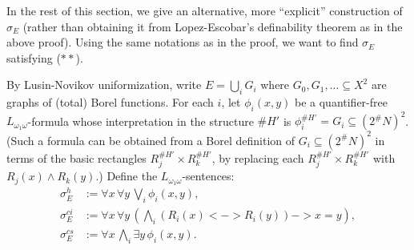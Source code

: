 \documentclass[11pt]{article}
\begin{document}
In the rest of this section, we give an alternative, more ``explicit'' construction of $\sigma_E$ (rather than obtaining it from Lopez-Escobar's definability theorem as in the above proof).  Using the same notations as in the proof, we want to find $\sigma_E$ satisfying ($**$).

By Lusin-Novikov uniformization, write $E = \bigcup_i G_i$ where $G_0, G_1, \dotsc \subseteq X^2$ are graphs of (total) Borel functions.  For each $i$, let $\phi_i(x, y)$ be a quantifier-free $L_{\omega_1\omega}$-formula whose interpretation in the structure $\#H'$ is $\phi_i^{\#H'} = G_i \subseteq (2^\#N)^2$.  (Such a formula can be obtained from a Borel definition of $G_i \subseteq (2^\#N)^2$ in terms of the basic rectangles $R_j^{\#H'} \times R_k^{\#H'}$, by replacing each $R_j^{\#H'} \times R_k^{\#H'}$ with $R_j(x) \wedge R_k(y)$.)  Define the $L_{\omega_1\omega}$-sentences:
\begin{align*}
\sigma^h_E &:= \forall x\, \forall y\, \bigvee_i \phi_i(x, y), \\
\sigma^{ci}_E &:= \forall x\, \forall y\, (\bigwedge_i (R_i(x) <-> R_i(y)) -> x = y), \\
\sigma^{cs}_E &:= \forall x\, \bigwedge_i \exists y\, \phi_i(x, y).
\end{align*}
\end{document}
